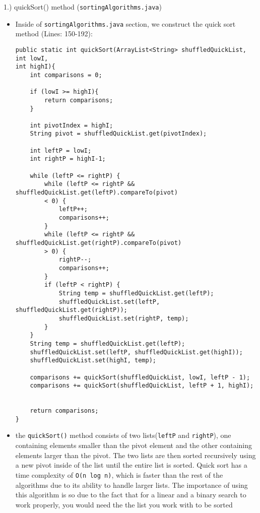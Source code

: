 \documentclass{article}
\begin{document}
\pagebreak
 
\begin{large}
    1.) quickSort() method (\verb|sortingAlgorithms.java|)
\end{large}


\begin{itemize}
\item Inside of \verb|sortingAlgorithms.java| section, we construct the quick sort method (Lines: 150-192):

\begin{verbatim}
public static int quickSort(ArrayList<String> shuffledQuickList, int lowI, 
int highI){
    int comparisons = 0;

    if (lowI >= highI){
        return comparisons;
    }

    int pivotIndex = highI;
    String pivot = shuffledQuickList.get(pivotIndex);

    int leftP = lowI;
    int rightP = highI-1;

    while (leftP <= rightP) {
        while (leftP <= rightP && shuffledQuickList.get(leftP).compareTo(pivot) 
        < 0) {
            leftP++;
            comparisons++;
        }
        while (leftP <= rightP && shuffledQuickList.get(rightP).compareTo(pivot) 
        > 0) {
            rightP--;
            comparisons++;
        }
        if (leftP < rightP) {
            String temp = shuffledQuickList.get(leftP);
            shuffledQuickList.set(leftP, shuffledQuickList.get(rightP));
            shuffledQuickList.set(rightP, temp);
        }
    }
    String temp = shuffledQuickList.get(leftP);
    shuffledQuickList.set(leftP, shuffledQuickList.get(highI));
    shuffledQuickList.set(highI, temp);

    comparisons += quickSort(shuffledQuickList, lowI, leftP - 1);
    comparisons += quickSort(shuffledQuickList, leftP + 1, highI);


    return comparisons;
}	
\end{verbatim}
\item the \verb|quickSort()| method consists of two lists(\verb|leftP| and \verb|rightP|), one containing elements smaller than the pivot element and the other containing elements larger than the pivot. The two lists are then sorted recursively using a new pivot inside of the list until the entire list is sorted. Quick sort has a time complexity of \verb|O(n log n)|, which is faster than the rest of the algorithms due to its ability to handle larger lists. The importance of using this algorithm is so due to the fact that for a linear and a binary search to work properly, you would need the the list you work with to be sorted\\

\end{itemize}
\end{document}
